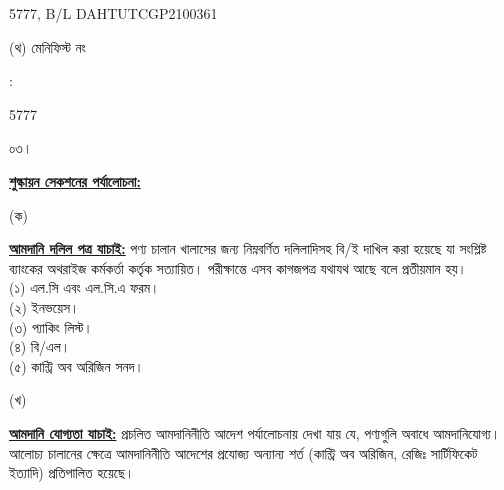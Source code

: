 \documentclass[12pt]{article}
\newcommand{\blno}{DAHTUTCGP2100361}
\newcommand{\menifest}{5777}
\begin{document}
\begin{minipage}[t]{0.53\linewidth}
{\menifest}, B/L {\blno}
\\
\end{minipage}
\begin{minipage}[t]{0.05\linewidth}
\hspace*{1em}
\end{minipage}
\begin{minipage}[t]{0.40\linewidth}
(থ) মেনিফিস্ট নং
\end{minipage}
\begin{minipage}[t]{0.02\linewidth}
:
\end{minipage}
\begin{minipage}[t]{0.53\linewidth}
{\menifest}
\\
\end{minipage}
\normalsize
\begin{minipage}[t]{0.05\linewidth}
০৩।
\end{minipage}
\begin{minipage}[t]{0.95\linewidth}
\underline{\textbf{শুল্কায়ন সেকশনের পর্যালোচনা:}}
\end{minipage}
\begin{minipage}[t]{0.05\linewidth}
\hspace{1em}
\end{minipage}
\begin{minipage}[t]{0.05\linewidth}
(ক)
\end{minipage}
\begin{minipage}[t]{0.90\linewidth}
\underline{\textbf{আমদানি দলিল পত্র যাচাই:}}
পণ্য চালান খালাসের জন্য নিম্নবর্ণিত দলিলাদিসহ বি/ই দাখিল করা
হয়েছে যা সংশ্লিষ্ট ব্যাংকের অথরাইজ কর্মকর্তা কর্তৃক সত্যায়িত।
পরীক্ষান্তে এসব কাগজপত্র যথাযথ আছে বলে প্রতীয়মান হয়।
\\
(১) এল.সি এবং এল.সি.এ ফরম।
\\
(২) ইনভয়েস।
\\
(৩) প্যাকিং লিস্ট।
\\
(৪) বি/এল।
\\
(৫) কান্ট্রি অব অরিজিন সনদ।
\\
\end{minipage}
\begin{minipage}[t]{0.05\linewidth}
\hspace{1em}
\end{minipage}
\begin{minipage}[t]{0.05\linewidth}
(খ)
\end{minipage}
\begin{minipage}[t]{0.90\linewidth}
\underline{\textbf{আমদানি যোগ্যতা যাচাই:}}
প্রচলিত আমদানিনীতি আদেশ পর্যালোচনায় দেখা যায় যে, পণ্যগুলি অবাধে আমদানিযোগ্য।
আলোচ্য চালানের ক্ষেত্রে আমদানিনীতি আদেশের প্রযোজ্য অন্যান্য শর্ত (কান্ট্রি অব অরিজিন, রেজিঃ
সার্টিফিকেট ইত্যাদি) প্রতিপালিত হয়েছে।
\\
\end{minipage}
\end{document}
